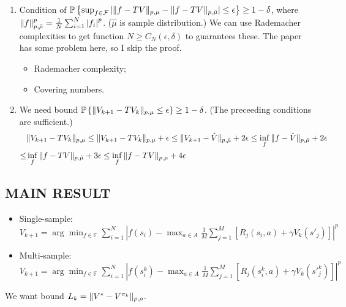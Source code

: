 \documentclass[a4paper]{article}
\begin{document}
\begin{enumerate}
    \item Condition of $ \mathbb{P} \left\{ \sup_{f \in \mathcal{F}} \left| \Arrowvert f - TV \Arrowvert_{p, \mu} - \Arrowvert f - TV \Arrowvert_{p, \hat \mu} \right| \le \epsilon \right\} \ge 1 - \delta $,
        where $ \Arrowvert f \Arrowvert^p_{p, \hat\mu} = \frac{1}{N} \sum^{N}_{i=1} \left| f_i \right|^{p} $. 
        ($ \hat \mu $ is sample distribution.)
        We can use Rademacher complexities to get function $ N \ge C_N(\epsilon, \delta) $ to guarantees these.
        The paper has some problem here, so I skip the proof.
        \begin{itemize}
            \item Rademacher complexity;
            \item Covering numbers.
        \end{itemize}
    \item We need bound $ \mathbb{P}\left\{ \Arrowvert V_{k+1} - TV_{k} \Arrowvert_{p, \mu} \le \epsilon \right\} \ge 1 - \delta $. (The preceeding conditions are sufficient.)
        \begin{align*}
            & \Arrowvert V_{k+1} - T V_{k} \Arrowvert_{p,\mu} \le \Arrowvert V_{k+1} - T V_{k} \Arrowvert_{p,\mu} + \epsilon \le \Arrowvert V_{k+1} - \hat V \Arrowvert_{p, \hat \mu} + 2\epsilon \le \inf_{f} \Arrowvert f - \hat V \Arrowvert_{p, \hat \mu} + 2\epsilon\\
            \le& \inf_{f} \Arrowvert f - T V \Arrowvert_{p, \hat \mu} + 3\epsilon
            \le \inf_{f} \Arrowvert f - T V \Arrowvert_{p, \mu} + 4\epsilon
        \end{align*}
\end{enumerate}
\subsection{MAIN RESULT}%

\begin{itemize}
    \item Single-sample: $ V_{k+1} = \arg\min_{f \in \mathbb{F}} \sum^{N}_{i=1} \left| f(s_i) - \max_{a \in A} \frac{1}{M} \sum^{M}_{j=1} \left[ R_j(s_i, a) + \gamma V_k(s'_j) \right] \right|^{p} $
    \item Multi-sample: $ V_{k+1} = \arg\min_{f \in \mathbb{F}} \sum^{N}_{i=1} \left| f(s^k_i) - \max_{a \in A} \frac{1}{M} \sum^{M}_{j=1} \left[ R_j(s^k_i, a) + \gamma V_k(s'^k_j) \right] \right|^p $
\end{itemize}
We want bound $ L_k = \Arrowvert V^* - V^{\pi_k} \Arrowvert_{p,\rho} $.
\end{document}
